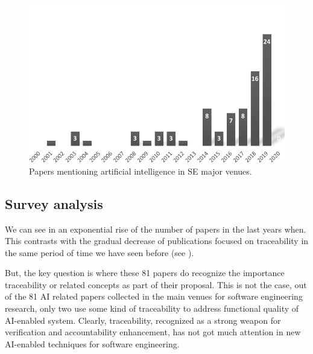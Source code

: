 
\begin{figure}[h]
		\centering
		\includegraphics[width=.6\linewidth]{images/publicationyears-aiinse}
		\caption{Papers mentioning artificial intelligence in SE major venues. }
		\label{fig:publicationyears-ai}
\end{figure}

\subsection{Survey analysis}
We can see in  an exponential rise of the number of papers in the last years when. This contrasts with the gradual decrease of publications focused on traceability in the same period of time we have seen before (see ).

But, the key question is where these 81 papers do recognize the importance traceability or related concepts as part of their proposal. This is not the case, out of the 81 AI related papers collected in the main venues for software engineering research, only two use some kind of traceability to address functional quality of AI-enabled system. Clearly, traceability, recognized as a strong weapon for verification and accountability enhancement, has not got much attention in new AI-enabled techniques for software engineering. 

